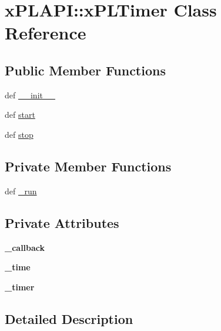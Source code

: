 \hypertarget{classxPLAPI_1_1xPLTimer}{
\section{xPLAPI::xPLTimer Class Reference}
\label{classxPLAPI_1_1xPLTimer}
}
\subsection*{Public Member Functions}
\begin{CompactItemize}
\item 
def \hyperlink{classxPLAPI_1_1xPLTimer_e651d6889d77aabd9227e622d5821d14}{\_\-\_\-init\_\-\_\-}
\item 
def \hyperlink{classxPLAPI_1_1xPLTimer_f9e579ecf5a8e2b2ed86ce78c5029a0e}{start}
\item 
def \hyperlink{classxPLAPI_1_1xPLTimer_2a04504c8d29908bc6601879fe63aa23}{stop}
\end{CompactItemize}
\subsection*{Private Member Functions}
\begin{CompactItemize}
\item 
def \hyperlink{classxPLAPI_1_1xPLTimer_59ac53c691fadf44bf28fb74a226251f}{\_\-run}
\end{CompactItemize}
\subsection*{Private Attributes}
\begin{CompactItemize}
\item 
\hypertarget{classxPLAPI_1_1xPLTimer_cf45a98a98a98ce25ae50665771d1e92}{
\textbf{\_\-callback}}
\label{classxPLAPI_1_1xPLTimer_cf45a98a98a98ce25ae50665771d1e92}

\item 
\hypertarget{classxPLAPI_1_1xPLTimer_a5189f41b3d558ccef9411af7c563796}{
\textbf{\_\-time}}
\label{classxPLAPI_1_1xPLTimer_a5189f41b3d558ccef9411af7c563796}

\item 
\hypertarget{classxPLAPI_1_1xPLTimer_f2a85e94f12015c68fb34b4461476cc3}{
\textbf{\_\-timer}}
\label{classxPLAPI_1_1xPLTimer_f2a85e94f12015c68fb34b4461476cc3}

\end{CompactItemize}


\subsection{Detailed Description}


